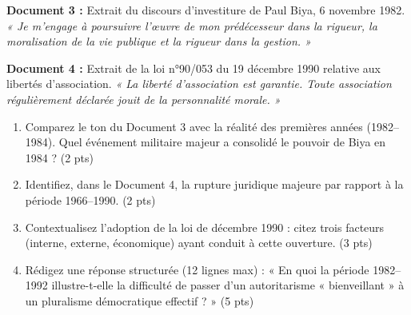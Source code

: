 \documentclass[11pt]{article}
\begin{document}
\begin{exercice}
\label{exo:biya_debut}
\textbf{Document 3 :} Extrait du discours d'investiture de Paul Biya, 6 novembre 1982. \textit{« Je m'engage à poursuivre l'œuvre de mon prédécesseur dans la rigueur, la moralisation de la vie publique et la rigueur dans la gestion. »}

\textbf{Document 4 :} Extrait de la loi n°90/053 du 19 décembre 1990 relative aux libertés d'association. \textit{« La liberté d'association est garantie. Toute association régulièrement déclarée jouit de la personnalité morale. »}

\begin{enumerate}
    \item Comparez le ton du Document 3 avec la réalité des premières années (1982--1984). Quel événement militaire majeur a consolidé le pouvoir de Biya en 1984 ? (2 pts)
    \item Identifiez, dans le Document 4, la rupture juridique majeure par rapport à la période 1966--1990. (2 pts)
    \item Contextualisez l'adoption de la loi de décembre 1990 : citez trois facteurs (interne, externe, économique) ayant conduit à cette ouverture. (3 pts)
    \item Rédigez une réponse structurée (12 lignes max) : « En quoi la période 1982--1992 illustre-t-elle la difficulté de passer d'un autoritarisme « bienveillant » à un pluralisme démocratique effectif ? » (5 pts)
\end{enumerate}
\end{exercice}
\end{document}
